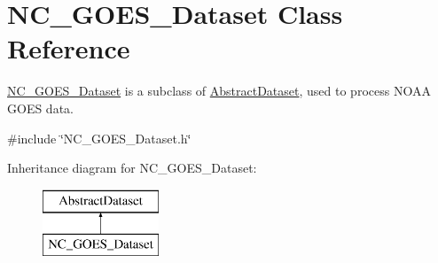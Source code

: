 \hypertarget{classNC__GOES__Dataset}{
\section{NC\_\-GOES\_\-Dataset Class Reference}
\label{classNC__GOES__Dataset}
}


\hyperlink{classNC__GOES__Dataset}{NC\_\-GOES\_\-Dataset} is a subclass of \hyperlink{classAbstractDataset}{AbstractDataset}, used to process NOAA GOES data.  




{\ttfamily \#include \char`\"{}NC\_\-GOES\_\-Dataset.h\char`\"{}}

Inheritance diagram for NC\_\-GOES\_\-Dataset:\begin{figure}[H]
\begin{center}
\leavevmode
\includegraphics[height=2.000000cm]{classNC__GOES__Dataset}
\end{center}
\end{figure}
